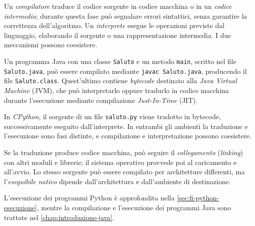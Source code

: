 Un \emph{compilatore} traduce il codice sorgente in codice macchina
o in un \emph{codice intermedio}; durante questa fase può segnalare
errori sintattici, senza garantire la correttezza dell'algoritmo.
Un \emph{interprete} esegue le operazioni previste dal linguaggio,
elaborando il sorgente o una rappresentazione intermedia.
I due meccanismi possono coesistere.

\begin{example}
Un programma Java con una classe \texttt{Saluto} e un metodo
\texttt{main}, scritto nel file \texttt{Saluto.java}, può essere
compilato mediante \texttt{javac Saluto.java}, producendo il file
\texttt{Saluto.class}.
Quest'ultimo contiene \emph{bytecode} destinato alla
\emph{Java Virtual Machine} (JVM), che può interpretarlo oppure
tradurlo in codice macchina durante l'esecuzione mediante compilazione
\emph{Just-In-Time} (JIT).

In \emph{CPython}, il sorgente di un file \texttt{saluto.py}
viene tradotto in bytecode, successivamente eseguito dall'interprete.
In entrambi gli ambienti la traduzione e l'esecuzione sono fasi
distinte, e compilazione e interpretazione possono coesistere.
\end{example}

Se la traduzione produce codice macchina, può seguire il
\emph{collegamento} (\emph{linking}) con altri moduli e librerie;
il sistema operativo provvede poi al caricamento e all'avvio.
Lo stesso sorgente può essere compilato per architetture differenti,
ma l'\emph{eseguibile nativo} dipende dall'architettura e
dall'ambiente di destinazione.

L'esecuzione dei programmi Python è approfondita nella
\cref{sec:fi-python-esecuzione}, mentre la compilazione e
l'esecuzione dei programmi Java sono trattate nel
\cref{chap:introduzione-java}.

